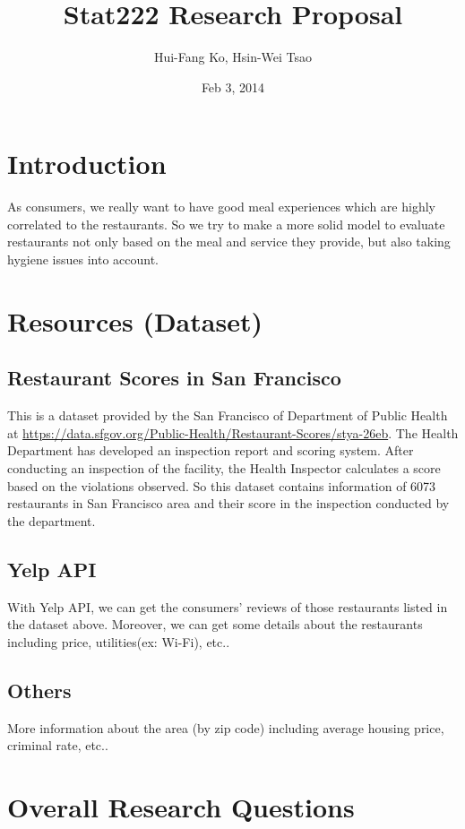 \documentclass{article}
\title{Stat222 Research Proposal}
\author{Hui-Fang Ko, Hsin-Wei Tsao}
\date{Feb 3, 2014}
\begin{document}
\maketitle

\section{Introduction}
As consumers, we really want to have good meal experiences which are highly correlated to the restaurants. So we try to make a more solid model to evaluate restaurants not only based on the meal and service they provide, but also taking hygiene issues into account.



\section{Resources (Dataset)}
\subsection{Restaurant Scores in San Francisco}
This is a dataset provided by the San Francisco of Department of Public Health at \url{https://data.sfgov.org/Public-Health/Restaurant-Scores/stya-26eb}. The Health Department has developed an inspection report and scoring system. After conducting an inspection of the facility, the Health Inspector calculates a score based on the violations observed. So this dataset contains information of 6073 restaurants in San Francisco area and their score in the inspection conducted by the department.

\subsection{Yelp API}
With Yelp API, we can get the consumers' reviews of those restaurants listed in the dataset above. Moreover, we can get some details about the restaurants including price, utilities(ex: Wi-Fi), etc.. 

\subsection{Others}
More information about the area (by zip code) including average housing price, criminal rate, etc..

\section{Overall Research Questions}
\end{document}
